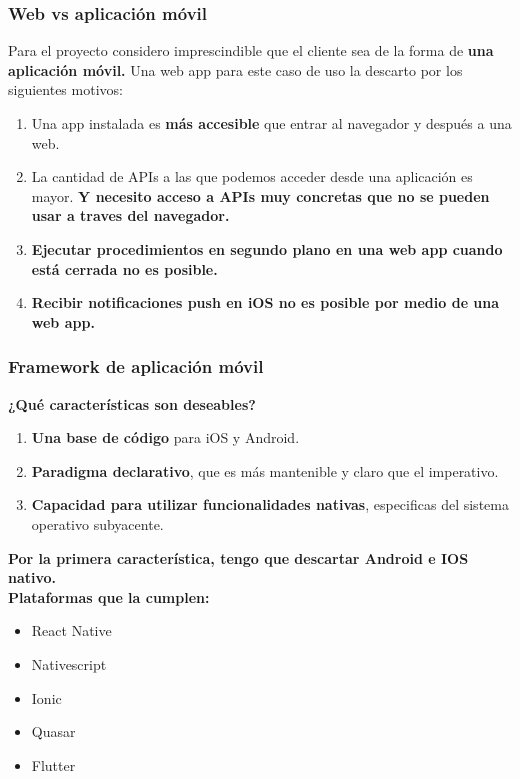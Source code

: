 \subsubsection{Web vs aplicación móvil}
Para el proyecto considero imprescindible que el cliente sea de la forma de \textbf{una aplicación móvil.} 
Una web app para este caso de uso la descarto por los siguientes motivos:
\begin{enumerate}
  \item Una app instalada es \textbf{más accesible} que entrar al navegador y después a una web.
  \item La cantidad de APIs a las que podemos acceder desde una aplicación es mayor. \textbf{Y necesito acceso a APIs muy concretas que no se pueden usar a traves del navegador.}
	\item \textbf{Ejecutar procedimientos en segundo plano en una web app cuando está cerrada no es posible.}
	\item \textbf{Recibir notificaciones push en iOS no es posible por medio de una web app.}
\end{enumerate}

\subsubsection{Framework de aplicación móvil}

\textbf{¿Qué características son deseables?}

\begin{enumerate}
  \item \textbf{Una base de código} para iOS y Android.
  \item \textbf{Paradigma declarativo}, que es más mantenible y claro que el imperativo.
  \item \textbf{Capacidad para utilizar funcionalidades nativas}, especificas del sistema operativo subyacente.
\end{enumerate}

\textbf{Por la primera característica, tengo que descartar Android e IOS nativo.} \\

\textbf{Plataformas que la cumplen: }
\begin{itemize}
  \item React Native \cite{reactnative}
  \item Nativescript \cite{nativescript}
  \item Ionic \cite{ionic}
  \item Quasar \cite{Quasar}
  \item Flutter \cite{flutter}
\end{itemize}


